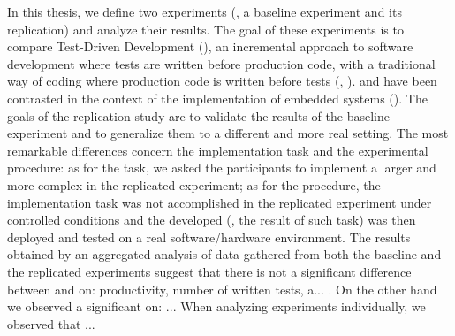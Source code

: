 In this thesis, we define two experiments (\ie, a baseline experiment and its replication) and analyze their results. The goal of these experiments is to compare Test-Driven Development (\tdd), an incremental approach to software development where tests are written before production code, with a traditional way of coding where production code is written before tests (\ie, \notdd). \tdd and \notdd have been contrasted in the context of the implementation of embedded systems (\ess). The goals of the replication study are to validate the results of the baseline experiment and to generalize them to a different and more real setting. The most remarkable differences concern the implementation task and the experimental procedure: as for the task, we asked the participants to implement a larger and more complex \es in the replicated experiment; as for the procedure, the implementation task was not accomplished in the replicated experiment under controlled conditions and the developed \es (\ie, the result of such task) was then deployed and tested on a real software/hardware environment.  
The results obtained by an aggregated analysis of data gathered from both the baseline and the replicated experiments suggest that there is not a significant difference between \tdd and \notdd on: productivity, number of written tests, a... . On the other hand we observed a significant  on: ... When analyzing experiments individually, we observed that ... 